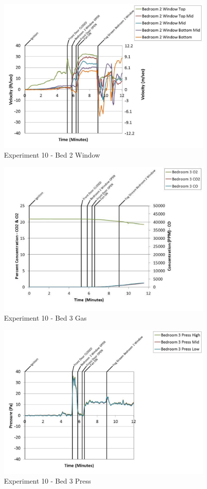 \documentclass{article}
\begin{document}
\begin{appendices}
	\begin{figure}[h!]
		\centering
		\includegraphics[height=3.05in]{0_Images/Results_Charts/Exp_10_Charts/Bed2Window.pdf}
		\caption{Experiment 10 - Bed 2 Window}
	\end{figure}
 
	\clearpage

	\begin{figure}[h!]
		\centering
		\includegraphics[height=3.05in]{0_Images/Results_Charts/Exp_10_Charts/Bed3Gas.pdf}
		\caption{Experiment 10 - Bed 3 Gas}
	\end{figure}
 

	\begin{figure}[h!]
		\centering
		\includegraphics[height=3.05in]{0_Images/Results_Charts/Exp_10_Charts/Bed3Press.pdf}
		\caption{Experiment 10 - Bed 3 Press}
	\end{figure}
 

\end{appendices}
\end{document}
